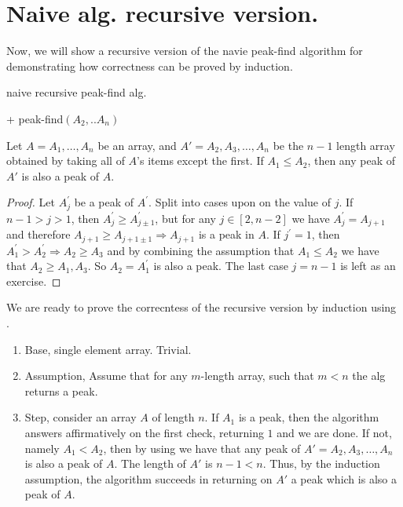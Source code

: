\section{Naive alg. recursive version.}
Now, we will show a recursive version of the navie peak-find algorithm for demonstrating how correctness can be proved by induction. 
\begin{algorithm}
\caption{naive recursive peak-find alg.}
  + peak-find$(A_{2}, .. A_{n})$
 \end{algorithm}

 \begin{claim} \label{claim:subarray} 
Let $A = A_1, \dots, A_n$ be an array, and $A' = A_2, A_3, \dots, A_n$ be the $n-1$ length array obtained by taking all of $A$'s items except the first. If $A_1 \le A_2$, then any peak of $A'$ is also a peak of $A$.
\end{claim}
\begin{proof} 
Let $A^{\prime}_{j}$ be a peak of $A^{\prime}$. Split into cases upon on the value of $j$. If $n-1 > j > 1$, then $A^{\prime}_{j} \ge A^{\prime}_{j \pm 1}$, but for any $j \in [2, n-2]$ we have $A^{\prime}_{j} = A_{j+1}$ and therefore $A_{j+1} \ge A_{j+1 \pm 1} \Rightarrow A_{j+1}$ is a peak in $A$. If $j^{\prime} = 1$, then $A^{\prime}_{1} > A^{\prime}_{2} \Rightarrow A_{2} \ge A_{3}$ and by combining the assumption that $A_{1} \le A_{2}$ we have that $A_{2} \ge A_{1}, A_{3}$. So $A_{2} = A^{\prime}_{1}$ is also a peak. The last case $j = n-1$ is left as an exercise.
\end{proof}
We are ready to prove the correcntess of the recursive version by induction using . 

\begin{enumerate}
  \item Base, single element array. Trivial. 
  \item Assumption, Assume that for any $m$-length array, such that $m<n$ the alg returns a peak. 
  \item Step, consider an array $A$ of length $n$. If $A_1$ is a peak, then the algorithm answers affirmatively on the first check, returning $1$ and we are done. If not, namely $A_1 < A_2$, then by using  we have that any peak of $A' = A_2, A_3, \dots, A_n$ is also a peak of $A$. The length of $A'$ is $n-1 < n$. Thus, by the induction assumption, the algorithm succeeds in returning on $A'$ a peak which is also a peak of $A$.
\end{enumerate}

